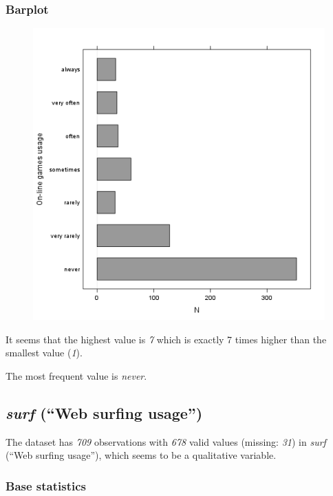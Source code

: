 \documentclass[]{article}
\makeatletter
\def\maxwidth{\ifdim\Gin@nat@width>\linewidth\linewidth
\else\Gin@nat@width\fi}
\let\Oldincludegraphics\includegraphics
\renewcommand{\includegraphics}[1]{\Oldincludegraphics[width=\maxwidth]{#1}}
\makeatother
\begin{document}
\subsubsection{Barplot}

\begin{figure}[htbp]
\centering
\includegraphics{e53046a09491443064e085131e547971.png}
\caption{}
\end{figure}

It seems that the highest value is \emph{7} which is exactly 7 times
higher than the smallest value (\emph{1}).

The most frequent value is \emph{never}.

\subsection{\emph{surf} (``Web surfing usage'')}

The dataset has \emph{709} observations with \emph{678} valid values
(missing: \emph{31}) in \emph{surf} (``Web surfing usage''), which seems
to be a qualitative variable.

\subsubsection{Base statistics}
\end{document}
